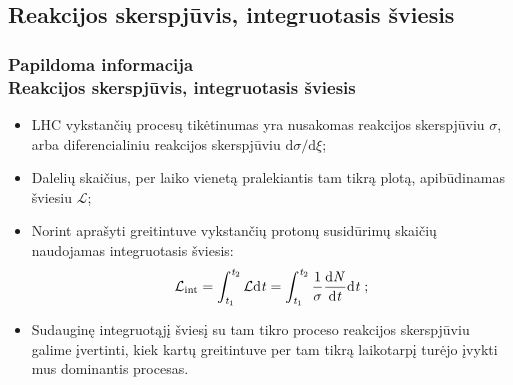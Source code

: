 \documentclass[xcolor=dvipsnames]{beamer}
\newcommand{\Lumi}{{\cal L}_\mathrm{int}}
\begin{document}
\begin{frame}
	\subsection{Reakcijos skerspjūvis, integruotasis šviesis}
	\frametitle{Papildoma informacija\\ \small Reakcijos skerspjūvis, integruotasis šviesis}
	\begin{itemize}
		\item LHC vykstančių procesų tikėtinumas yra nusakomas reakcijos skerspjūviu $\sigma$, arba
		diferencialiniu reakcijos skerspjūviu $\mathrm{d}\sigma / \mathrm{d}\xi$;
		\item Dalelių skaičius, per laiko vienetą pralekiantis tam tikrą plotą, apibūdinamas šviesiu $\mathcal{L}$;
		\item Norint aprašyti greitintuve vykstančių protonų susidūrimų skaičių naudojamas integruotasis šviesis:
		\begin{equation*}
			\Lumi=\int_{\mathit{t}_1}^{\mathit{t}_2} \mathcal{L}\mathrm{d}\mathit{t} =
			\int_{\mathit{t}_1}^{\mathit{t}_2} \frac{1}{\sigma}\frac{\mathrm{d}\mathit{N}}{\mathrm{d}\mathit{t}} \mathrm{d}\mathit{t} \; ;
		\end{equation*}
		\item Sudauginę integruotąjį šviesį su tam tikro proceso reakcijos skerspjūviu galime įvertinti, kiek kartų
		greitintuve per tam tikrą laikotarpį turėjo įvykti mus dominantis procesas.
	\end{itemize}
\end{frame}
\end{document}
